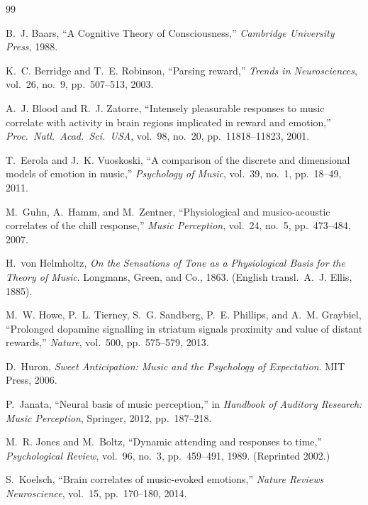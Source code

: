 \documentclass[10pt,twocolumn]{article}
\begin{document}
\begin{thebibliography}{99}
\small

B.~J. Baars, ``A Cognitive Theory of Consciousness,'' \textit{Cambridge University Press}, 1988.

K.~C. Berridge and T.~E. Robinson, ``Parsing reward,'' \textit{Trends in Neurosciences}, vol.~26, no.~9, pp.~507--513, 2003.

A.~J. Blood and R.~J. Zatorre, ``Intensely pleasurable responses to music correlate with activity in brain regions implicated in reward and emotion,'' \textit{Proc.\ Natl.\ Acad.\ Sci.\ USA}, vol.~98, no.~20, pp.~11818--11823, 2001.

T.~Eerola and J.~K. Vuoskoski, ``A comparison of the discrete and dimensional models of emotion in music,'' \textit{Psychology of Music}, vol.~39, no.~1, pp.~18--49, 2011.

M.~Guhn, A.~Hamm, and M.~Zentner, ``Physiological and musico-acoustic correlates of the chill response,'' \textit{Music Perception}, vol.~24, no.~5, pp.~473--484, 2007.

H.~von Helmholtz, \textit{On the Sensations of Tone as a Physiological Basis for the Theory of Music}. Longmans, Green, and Co., 1863. (English transl.\ A.~J. Ellis, 1885).

M.~W. Howe, P.~L. Tierney, S.~G. Sandberg, P.~E. Phillips, and A.~M. Graybiel, ``Prolonged dopamine signalling in striatum signals proximity and value of distant rewards,'' \textit{Nature}, vol.~500, pp.~575--579, 2013.

D.~Huron, \textit{Sweet Anticipation: Music and the Psychology of Expectation}. MIT Press, 2006.

P.~Janata, ``Neural basis of music perception,'' in \textit{Handbook of Auditory Research: Music Perception}, Springer, 2012, pp.~187--218.

M.~R. Jones and M.~Boltz, ``Dynamic attending and responses to time,'' \textit{Psychological Review}, vol.~96, no.~3, pp.~459--491, 1989. (Reprinted 2002.)

S.~Koelsch, ``Brain correlates of music-evoked emotions,'' \textit{Nature Reviews Neuroscience}, vol.~15, pp.~170--180, 2014.


\end{thebibliography}
\end{document}
